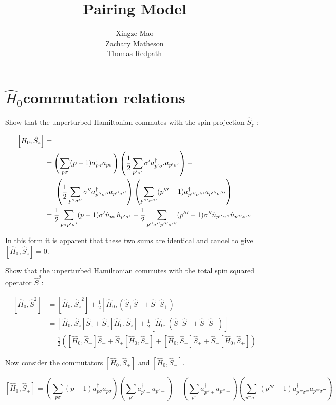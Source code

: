 \documentclass[11pt]{article}
\title{Pairing Model}
\author{Xingze Mao \\ Zachary Matheson \\ Thomas Redpath}
\newcommand{\sz}[2]{%
	\ensuremath{ \frac{1}{2} \sum_{#1 #2} #2 a _{#1 #2} ^{\dagger} a _{#1 #2} } }
\newcommand{\splus}[1]{%
	\ensuremath{ \sum_{#1}  a _{#1 +} ^{\dagger} a _{#1 -} } }
\newcommand{\hzero}[2]{%
	\ensuremath{ \sum_{#1 #2} (#1-1) a _{#1 #2} ^{\dagger} a _{#1 #2} }}
\newcommand{\numop}[2]{%
	\ensuremath{ \hat{n} _{#1 #2} }}
\newcommand{\sop}[1]{%
	\ensuremath{ \hat{S}_{#1} } }
\newcommand{\hop}{
	\ensuremath{ \hat{H} _0 }}
\newcommand{\commutator}[2]{%
	\ensuremath{ \left [ #1,#2 \right ] }}
\begin{document}
\maketitle

\section*{\hop commutation relations}

Show that the unperturbed Hamiltonian commutes with the spin projection \sop{z}:


\begin{align*}
	\left [ H _0, \sop{z} \right ] &=\\
	&=\left ( \hzero{p}{\sigma} \right ) \left ( \sz{p'}{\sigma'} \right ) -\\
	& \hspace{5mm} \left ( \sz{p''}{\sigma''} \right ) \left ( \hzero{p'''}{\sigma'''} \right )\\
	&= \frac{1}{2} \sum_{p \sigma p' \sigma'} (p-1) \sigma' \numop{p}{\sigma} \numop{p'}{\sigma'} - \frac{1}{2} \sum_{p'' \sigma'' p''' \sigma'''} (p'''-1) \sigma'' \numop{p''}{\sigma''} \numop{p'''}{\sigma'''}
\end{align*}

In this form it is apparent that these two sums are identical and cancel to give $[\hat{H}_0,\sop{z}]=0$.

Show that the unperturbed Hamiltonian commutes with the total spin squared operator $\hat{S}^2$:

\begin{align}
	\left [ \hat{H}_0, \hat{S}^2 \right ] &= \left [ \hop, \sop{z} ^2 \right ] + \frac{1}{2} \left [ \hop,(\sop{+} \sop{-} + \sop{-}\sop{+}) \right ]\\
	&= \commutator{\hop}{\sop{z}} \sop{z} + \sop{z} \commutator{\hop}{\sop{z}} +\frac{1}{2} \commutator{\hop}{(\sop{+}\sop{-} + \sop{-}\sop{+})}\\
	&= \frac{1}{2} \left ( \commutator{\hop}{\sop{+}} \sop{-} + \sop{+} \commutator{\hop}{\sop{-}} + \commutator{\hop}{\sop{-}} \sop{+} + \sop{-} \commutator{\hop}{\sop{+}} \right )
\end{align}

Now consider the commutators \commutator{\hop}{\sop{+}} and \commutator{\hop}{\sop{-}}.

\begin{equation}
	\commutator{\hop}{\sop{+}} = \left ( \hzero{p}{\sigma} \right ) \left ( \splus{p'} \right ) - \left ( \splus{p''} \right ) \left ( \hzero{p'''}{\sigma'''} \right )
	\label{eq:hsplus}
\end{equation}
\end{document}
